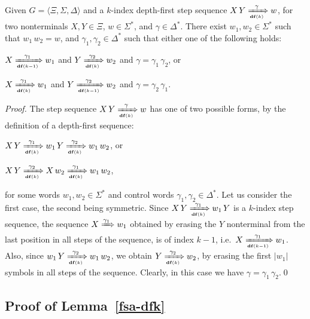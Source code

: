 \documentclass[final]{llncs}
\def\tuple#1{{\langle #1 \rangle}}
\def\len#1{{\vert{#1}\vert}}
\def\prod{\Delta}
\def\df#1{\scriptscriptstyle\mathbf{df}(#1)}
\def\Vars{\ensuremath{\Xi}}
\begin{document}
\begin{lemma}\label{lem:leibniz}
Given $G = \tuple{\Vars, \Sigma, \prod}$ and a $k$-index depth-first
step sequence $X\, Y \xRightarrow[\df{k}]{\gamma} w$, for two
nonterminals $X,Y \in \Vars$, $w \in \Sigma^*$, and
$\gamma \in \prod^*$.  There exist $w_1, w_2 \in
\Sigma^*$ such that $w_1\, w_2 = w$, and $\gamma_1, \gamma_2 \in \prod^*$ 
such that either one of the following holds:
\begin{compactenum}
\item $X \xRightarrow[\df{k-1}]{\gamma_1} w_1$ and $Y \xRightarrow[\df{k}]{\gamma_2} w_2$
and $\gamma=\gamma_1\, \gamma_2$, or
\item $X \xRightarrow[\df{k}]{\gamma_1} w_1$ and $Y \xRightarrow[\df{k-1}]{\gamma_2} w_2$
and $\gamma=\gamma_2\, \gamma_1$. 
\end{compactenum}
\end{lemma}
\begin{proof}
The step sequence $X\, Y \xRightarrow[\df{k}]{\gamma} w$ has one of two
possible forms, by the definition of a depth-first sequence:
\begin{compactitem}
\item $X\, Y \xRightarrow[\df{k}]{\gamma_1} w_1\, Y \xRightarrow[\df{k}]{\gamma_2} w_1\, w_2$, or
\item $X\, Y \xRightarrow[\df{k}]{\gamma_2} X\, w_2 \xRightarrow[\df{k}]{\gamma_1} w_1\, w_2$, 
\end{compactitem}
for some words $w_1, w_2 \in \Sigma^*$ and control words
$\gamma_1, \gamma_2 \in \prod^*$. Let us consider the first case, the
second being symmetric. Since $X\, Y \xRightarrow[\df{k}]{\gamma_1}
w_1\, Y$ is a $k$-index step sequence, the sequence
$X \xRightarrow{\gamma_1} w_1$ obtained by erasing the $Y$
nonterminal from the last position in all steps of the sequence, is of index
$k-1$, i.e.\ $X \xRightarrow[\df{k-1}]{\gamma_1} w_1$. Also, since
$w_1\, Y \xRightarrow[\df{k}]{\gamma_2} w_1\, w_2$, we obtain
$Y \xRightarrow[\df{k}]{\gamma_2} w_2$, by erasing the first \(\len{w_1}\)
symbols in all steps of the sequence. Clearly, in this case we have
$\gamma=\gamma_1\, \gamma_2$.\qed
\end{proof}

\subsection{Proof of Lemma~\ref{fsa-dfk}}\label{app:fsa-dfk}
\end{document}
